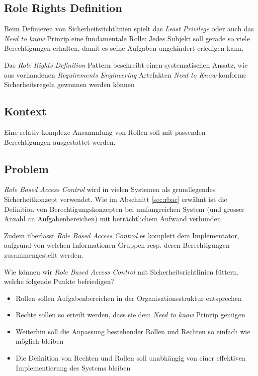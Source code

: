 \subsection{Role Rights Definition}
Beim Definieren von Sicherheitsrichtlinien spielt das \emph{Least Privilege} oder auch das \emph{Need to know} Prinzip eine fundamentale Rolle: Jedes Subjekt soll gerade so viele Berechtigungen erhalten, damit es seine Aufgaben ungehindert erledigen kann.

Das \emph{Role Rights Definition} Pattern beschreibt einen systematischen Ansatz, wie aus vorhandenen \emph{Requirements Engineering} Artefakten \emph{Need to Know}-konforme Sicherheitsregeln gewonnen werden können

\subsection*{Kontext}
Eine relativ komplexe Ansammlung von Rollen soll mit passenden Berechtigungen ausgestattet werden.

\subsection*{Problem}
\emph{Role Based Access Control} wird in vielen Systemen als grundlegendes Sicherheitkonzept verwendet. Wie im Abschnitt \ref{sec:rbac} erwähnt ist die Definition von Berechtigungskonzepten bei umfangreichen System (und grosser Anzahl an Aufgabenbereichen) mit beträchtlichem Aufwand verbunden.

Zudem überlässt \emph{Role Based Access Control} es komplett dem Implementator, aufgrund von welchen Informationen Gruppen resp. deren Berechtigungen zusammengestellt werden.


Wie können wir \emph{Role Based Access Control} mit Sicherheitsrichtlinien füttern, welche folgende Punkte befriedigen?
\begin{itemize}
	\item Rollen sollen Aufgabenbereichen in der Organisationsstruktur entsprechen
	\item Rechte sollen so erteilt werden, dass sie dem \emph{Need to know} Prinzip genügen
	\item Weiterhin soll die Anpassung bestehender Rollen und Rechten so einfach wie möglich bleiben
	\item Die Definition von Rechten und Rollen soll unabhängig von einer effektiven Implementierung des Systems bleiben
\end{itemize}


